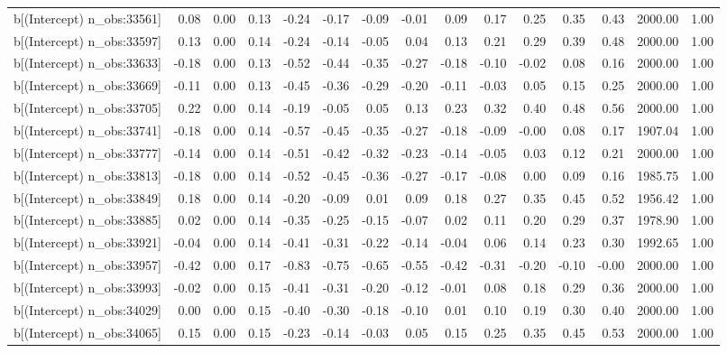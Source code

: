 \begin{table}[ht]
\begin{tabular}{rrrrrrrrrrrrrrr}
  b[(Intercept) n\_obs:33561] & 0.08 & 0.00 & 0.13 & -0.24 & -0.17 & -0.09 & -0.01 & 0.09 & 0.17 & 0.25 & 0.35 & 0.43 & 2000.00 & 1.00 \\ 
  b[(Intercept) n\_obs:33597] & 0.13 & 0.00 & 0.14 & -0.24 & -0.14 & -0.05 & 0.04 & 0.13 & 0.21 & 0.29 & 0.39 & 0.48 & 2000.00 & 1.00 \\ 
  b[(Intercept) n\_obs:33633] & -0.18 & 0.00 & 0.13 & -0.52 & -0.44 & -0.35 & -0.27 & -0.18 & -0.10 & -0.02 & 0.08 & 0.16 & 2000.00 & 1.00 \\ 
  b[(Intercept) n\_obs:33669] & -0.11 & 0.00 & 0.13 & -0.45 & -0.36 & -0.29 & -0.20 & -0.11 & -0.03 & 0.05 & 0.15 & 0.25 & 2000.00 & 1.00 \\ 
  b[(Intercept) n\_obs:33705] & 0.22 & 0.00 & 0.14 & -0.19 & -0.05 & 0.05 & 0.13 & 0.23 & 0.32 & 0.40 & 0.48 & 0.56 & 2000.00 & 1.00 \\ 
  b[(Intercept) n\_obs:33741] & -0.18 & 0.00 & 0.14 & -0.57 & -0.45 & -0.35 & -0.27 & -0.18 & -0.09 & -0.00 & 0.08 & 0.17 & 1907.04 & 1.00 \\ 
  b[(Intercept) n\_obs:33777] & -0.14 & 0.00 & 0.14 & -0.51 & -0.42 & -0.32 & -0.23 & -0.14 & -0.05 & 0.03 & 0.12 & 0.21 & 2000.00 & 1.00 \\ 
  b[(Intercept) n\_obs:33813] & -0.18 & 0.00 & 0.14 & -0.52 & -0.45 & -0.36 & -0.27 & -0.17 & -0.08 & 0.00 & 0.09 & 0.16 & 1985.75 & 1.00 \\ 
  b[(Intercept) n\_obs:33849] & 0.18 & 0.00 & 0.14 & -0.20 & -0.09 & 0.01 & 0.09 & 0.18 & 0.27 & 0.35 & 0.45 & 0.52 & 1956.42 & 1.00 \\ 
  b[(Intercept) n\_obs:33885] & 0.02 & 0.00 & 0.14 & -0.35 & -0.25 & -0.15 & -0.07 & 0.02 & 0.11 & 0.20 & 0.29 & 0.37 & 1978.90 & 1.00 \\ 
  b[(Intercept) n\_obs:33921] & -0.04 & 0.00 & 0.14 & -0.41 & -0.31 & -0.22 & -0.14 & -0.04 & 0.06 & 0.14 & 0.23 & 0.30 & 1992.65 & 1.00 \\ 
  b[(Intercept) n\_obs:33957] & -0.42 & 0.00 & 0.17 & -0.83 & -0.75 & -0.65 & -0.55 & -0.42 & -0.31 & -0.20 & -0.10 & -0.00 & 2000.00 & 1.00 \\ 
  b[(Intercept) n\_obs:33993] & -0.02 & 0.00 & 0.15 & -0.41 & -0.31 & -0.20 & -0.12 & -0.01 & 0.08 & 0.18 & 0.29 & 0.36 & 2000.00 & 1.00 \\ 
  b[(Intercept) n\_obs:34029] & 0.00 & 0.00 & 0.15 & -0.40 & -0.30 & -0.18 & -0.10 & 0.01 & 0.10 & 0.19 & 0.30 & 0.40 & 2000.00 & 1.00 \\ 
  b[(Intercept) n\_obs:34065] & 0.15 & 0.00 & 0.15 & -0.23 & -0.14 & -0.03 & 0.05 & 0.15 & 0.25 & 0.35 & 0.45 & 0.53 & 2000.00 & 1.00 \\ 

\end{tabular}
\end{table}
